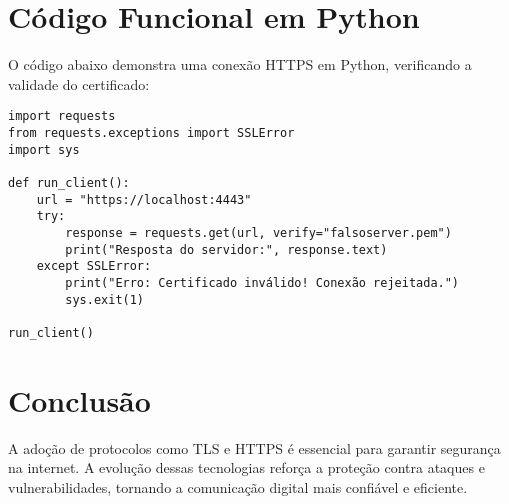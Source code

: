 \documentclass[a4paper,12pt]{article}
\begin{document}
\section{Código Funcional em Python}
O código abaixo demonstra uma conexão HTTPS em Python, verificando a validade do certificado:

\begin{verbatim}
import requests
from requests.exceptions import SSLError
import sys

def run_client():
    url = "https://localhost:4443"
    try:
        response = requests.get(url, verify="falsoserver.pem")
        print("Resposta do servidor:", response.text)
    except SSLError:
        print("Erro: Certificado inválido! Conexão rejeitada.")
        sys.exit(1)

run_client()
\end{verbatim}

\section{Conclusão}
A adoção de protocolos como TLS e HTTPS é essencial para garantir segurança na internet. A evolução dessas tecnologias reforça a proteção contra ataques e vulnerabilidades, tornando a comunicação digital mais confiável e eficiente.
\end{document}
